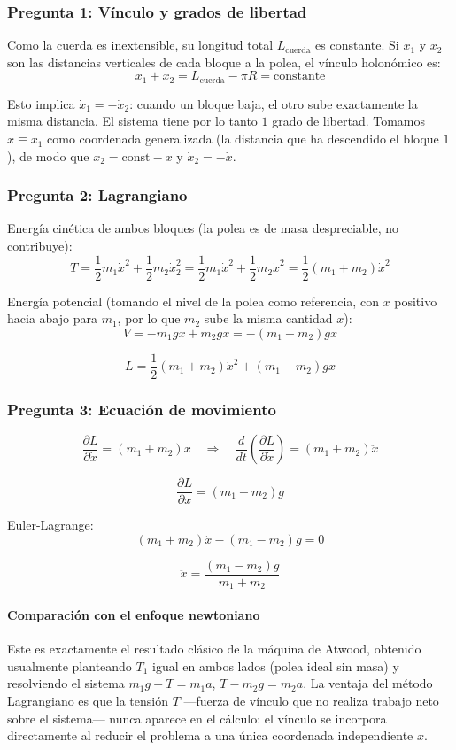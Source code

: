 \begin{sol}

\subsubsection*{Pregunta 1: Vínculo y grados de libertad}

Como la cuerda es inextensible, su longitud total $L_{\text{cuerda}}$ es constante. Si $x_1$ y $x_2$ son las distancias verticales de cada bloque a la polea, el vínculo holonómico es:
$$x_1 + x_2 = L_{\text{cuerda}} - \pi R = \text{constante}$$

Esto implica $\dot{x}_1 = -\dot{x}_2$: cuando un bloque baja, el otro sube exactamente la misma distancia. El sistema tiene por lo tanto $1$ grado de libertad. Tomamos $x \equiv x_1$ como coordenada generalizada (la distancia que ha descendido el bloque $1$), de modo que $x_2 = \text{const} - x$ y $\dot{x}_2 = -\dot{x}$.

\subsubsection*{Pregunta 2: Lagrangiano}

Energía cinética de ambos bloques (la polea es de masa despreciable, no contribuye):
$$T = \frac{1}{2}m_1\dot{x}^2 + \frac{1}{2}m_2\dot{x}_2^2 = \frac{1}{2}m_1\dot{x}^2 + \frac{1}{2}m_2\dot{x}^2 = \frac{1}{2}(m_1+m_2)\dot{x}^2$$

Energía potencial (tomando el nivel de la polea como referencia, con $x$ positivo hacia abajo para $m_1$, por lo que $m_2$ sube la misma cantidad $x$):
$$V = -m_1gx + m_2gx = -(m_1-m_2)gx$$

$$\boxed{L = \frac{1}{2}(m_1+m_2)\dot{x}^2 + (m_1-m_2)gx}$$

\subsubsection*{Pregunta 3: Ecuación de movimiento}

$$\frac{\partial L}{\partial\dot{x}} = (m_1+m_2)\dot{x} \quad\Rightarrow\quad \frac{d}{dt}\left(\frac{\partial L}{\partial\dot{x}}\right) = (m_1+m_2)\ddot{x}$$

$$\frac{\partial L}{\partial x} = (m_1-m_2)g$$

Euler-Lagrange:
$$(m_1+m_2)\ddot{x} - (m_1-m_2)g = 0$$

$$\boxed{\ddot{x} = \frac{(m_1-m_2)g}{m_1+m_2}}$$

\paragraph{Comparación con el enfoque newtoniano} Este es exactamente el resultado clásico de la máquina de Atwood, obtenido usualmente planteando $T_1$ igual en ambos lados (polea ideal sin masa) y resolviendo el sistema $m_1g - T = m_1a$, $T - m_2g = m_2a$. La ventaja del método Lagrangiano es que la tensión $T$ —fuerza de vínculo que no realiza trabajo neto sobre el sistema— nunca aparece en el cálculo: el vínculo se incorpora directamente al reducir el problema a una única coordenada independiente $x$.

\end{sol}
